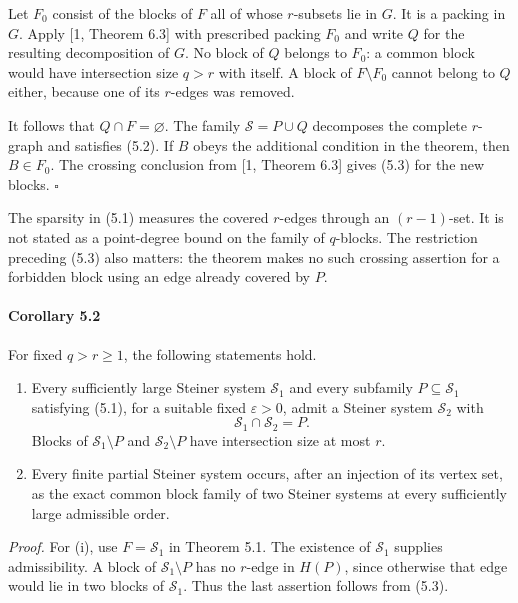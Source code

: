 \documentclass[english,11pt,a4paper]{article}
\begin{document}
Let \(F_0\) consist of the blocks of \(F\) all of whose \(r\)-subsets lie in \(G\). It is a packing in \(G\). Apply {[}1, Theorem 6.3{]} with prescribed packing \(F_0\) and write \(Q\) for the resulting decomposition of \(G\). No block of \(Q\) belongs to \(F_0\): a common block would have intersection size \(q>r\) with itself. A block of \(F\setminus F_0\) cannot belong to \(Q\) either, because one of its \(r\)-edges was removed.

It follows that \(Q\cap F=\varnothing\). The family \(\mathcal S=P\cup Q\) decomposes the complete \(r\)-graph and satisfies (5.2). If \(B\) obeys the additional condition in the theorem, then \(B\in F_0\). The crossing conclusion from {[}1, Theorem 6.3{]} gives (5.3) for the new blocks. \(\square\)

The sparsity in (5.1) measures the covered \(r\)-edges through an \((r-1)\)-set. It is not stated as a point-degree bound on the family of \(q\)-blocks. The restriction preceding (5.3) also matters: the theorem makes no such crossing assertion for a forbidden block using an edge already covered by \(P\).

\par
\begin{samepage}
\paragraph{Corollary 5.2}\label{corollary-5.2}

For fixed \(q>r\ge1\), the following statements hold.

\begin{enumerate}
\def\labelenumi{(\roman{enumi})}
\item
  Every sufficiently large Steiner system \(\mathcal S_1\) and every subfamily \(P\subseteq\mathcal S_1\) satisfying (5.1), for a suitable fixed \(\varepsilon>0\), admit a Steiner system \(\mathcal S_2\) with \[\mathcal S_1\cap\mathcal S_2=P.
  \tag{5.4}\] Blocks of \(\mathcal S_1\setminus P\) and \(\mathcal S_2\setminus P\) have intersection size at most \(r\).
\item
  Every finite partial Steiner system occurs, after an injection of its vertex set, as the exact common block family of two Steiner systems at every sufficiently large admissible order.
\end{enumerate}

\end{samepage}
\emph{Proof.} For (i), use \(F=\mathcal S_1\) in Theorem 5.1. The existence of \(\mathcal S_1\) supplies admissibility. A block of \(\mathcal S_1\setminus P\) has no \(r\)-edge in \(H(P)\), since otherwise that edge would lie in two blocks of \(\mathcal S_1\). Thus the last assertion follows from (5.3).
\end{document}
